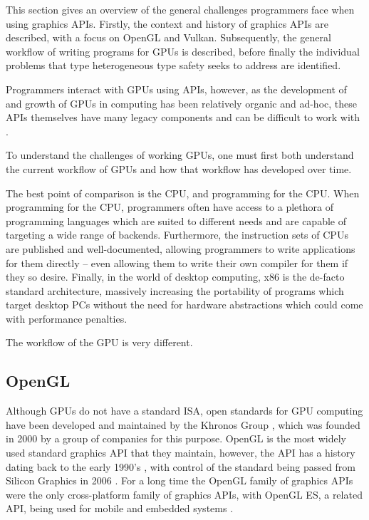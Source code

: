 \documentclass[a4paper,12pt,twoside,openright]{report}
\begin{document}
This section gives an overview of the general challenges programmers face when
using graphics APIs. Firstly, the context and history of graphics APIs are
described, with a focus on OpenGL and Vulkan. Subsequently, the general
workflow of writing programs for GPUs is described, before finally the
individual problems that type heterogeneous type safety seeks to address are
identified.

Programmers interact with GPUs using APIs, however, as the development of and
growth of GPUs in computing has been relatively organic and ad-hoc, these APIs
themselves have many legacy components and can be difficult to work with
\cite{NVIDIAInternshipLessons}.


To understand the challenges of working GPUs, one must first both understand
the current workflow of GPUs and how that workflow has developed over time.

The best point of comparison is the CPU, and programming for the CPU. When
programming for the CPU, programmers often have access to a plethora of
programming languages which are suited to different needs and are capable of
targeting a wide range of backends. Furthermore, the instruction sets of CPUs
are published and well-documented, allowing programmers to write applications
for them directly -- even allowing them to write their own compiler for them
if they so desire. Finally, in the world of desktop computing, x86 is the
de-facto standard architecture, massively increasing the portability of
programs which target desktop PCs without the need for hardware abstractions
which could come with performance penalties.

The workflow of the GPU is very different.

\subsection{OpenGL}

Although GPUs do not have a standard ISA, open standards for GPU computing have
been developed and maintained by the Khronos Group \cite{TODO}, which was
founded in 2000 by a group of companies for this purpose. OpenGL is the most
widely used standard graphics API that they maintain, however, the API has a
history dating back to the early 1990's \cite{TODO}, with control of the
standard being passed from Silicon Graphics in 2006 \cite{TODO}. For a long
time the OpenGL family of graphics APIs were the only cross-platform family of
graphics APIs, with OpenGL ES, a related API, being used for mobile and
embedded systems \cite{TODO}.
\end{document}
